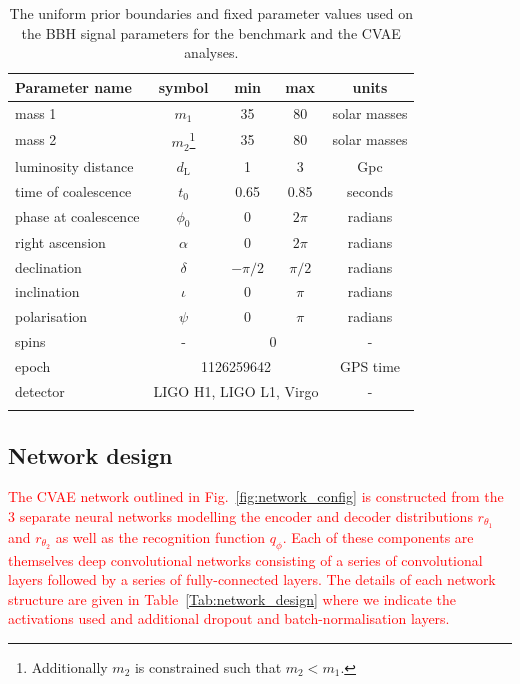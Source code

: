 \documentclass[%
showpacs,
nofootinbib,
 amsmath,amssymb,
 aps,
 twocolumn,
 prl,
 reprint,
floatfix,
]{revtex4-1}
\newcommand{\new}[1]{\textcolor{red}{#1}}
\begin{document}
%
%
\begin{table}
\centering
\caption{The uniform prior boundaries and fixed parameter values used on the \ac{BBH} signal parameters for the benchmark
and the \ac{CVAE} analyses.}
\begin{tabular}[t]{lcccc}
\toprule
Parameter name & symbol & min & max & units \\
\hline
mass 1 & $m_1$ & 35 & 80 & solar masses \\
mass 2 & $m_2$\footnote{Additionally $m_2$ is constrained such that
$m_{2}<m_{1}$.} & 35 & 80 & solar masses \\
luminosity distance & $d_{\text{L}}$ & 1 & 3 & Gpc \\
time of coalescence & $t_{0}$ & 0.65 & 0.85 & seconds \\
phase at coalescence & $\phi_{0}$ & 0 & $2\pi$ & radians \\
right ascension & $\alpha$ & 0 & $2\pi$ & radians \\
declination & $\delta$ & $-\pi/2$ & $\pi/2$ & radians \\
inclination & $\iota$ & 0 & $\pi$ & radians \\
polarisation & $\psi$ & 0 & $\pi$ & radians \\
\hline
spins & - & \multicolumn{2}{c}{0} & - \\
epoch & \multicolumn{3}{c}{1126259642} & GPS time \\
detector & \multicolumn{3}{c}{LIGO H1, LIGO L1, Virgo} & - \\
\botrule
\end{tabular}
\label{tab:prior_ranges}
\end{table}

\subsection{Network design}
%
%

%
%
\new{The \ac{CVAE} network outlined in Fig.~\ref{fig:network_config} is constructed from
the 3 separate neural networks modelling the encoder and decoder distributions
$r_{\theta_1}$ and $r_{\theta_2}$ as well as the recognition function
$q_{\phi}$. Each of these components are themselves deep convolutional networks
consisting of a series of convolutional layers followed by a series of
fully-connected layers. The details of each network structure are given in
Table~\ref{Tab:network_design} where we indicate the activations used and additional
dropout and batch-normalisation layers.}
\end{document}
